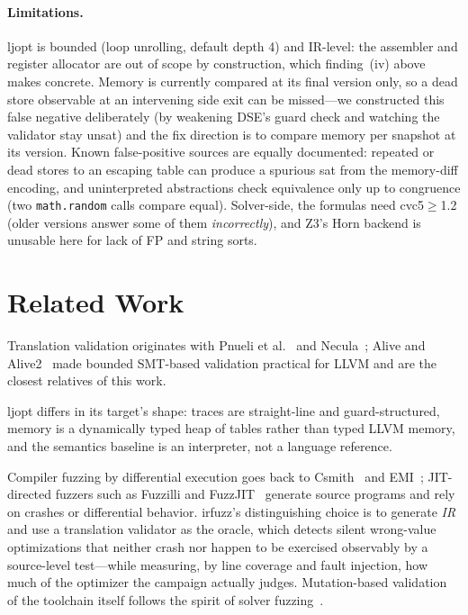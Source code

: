 \documentclass[runningheads]{llncs}
\newif\iffull \fulltrue
\newcommand{\full}[1]{#1}
\newcommand{\brief}[1]{}
\newcommand{\full}[1]{}
\newcommand{\brief}[1]{#1}
\newcommand{\ljopt}{\textsf{ljopt}}
\newcommand{\irfuzz}{\textsf{irfuzz}}
\begin{document}
\paragraph{Limitations.}
\ljopt{} is bounded (loop unrolling, default depth 4) and IR-level: the
assembler and register allocator are out of scope by construction, which
finding~(iv) above makes concrete. Memory is currently compared at its
final version only, so a dead store observable at an intervening side exit
can be missed---we constructed this false negative deliberately (by
weakening DSE's guard check and watching the validator stay
\textsf{unsat}) and the fix direction is to compare memory per snapshot at
its version. \iffull Known false-positive sources are equally
documented:
repeated or dead stores to an escaping table can produce a spurious
\textsf{sat} from the memory-diff encoding, and uninterpreted abstractions
check equivalence only up to congruence (two \texttt{math.random} calls
compare equal). Solver-side, the formulas need cvc5${}\geq{}$1.2
(older versions answer some of them \emph{incorrectly}), and Z3's Horn
backend is unusable here for lack of FP and string sorts.\fi

\iffull
\section{Related Work}\label{sec:related}
\else
\section{Related Work and Conclusion}
\fi

Translation validation originates with Pnueli et
al.~\cite{pnueli1998tv} and Necula~\cite{necula2000tv}; Alive and
Alive2~\cite{lopes2015alive,lopes2021alive2} made bounded SMT-based
validation practical for LLVM and are the closest relatives of this work.
\iffull
\ljopt{} differs in its target's shape: traces are straight-line and
guard-structured, memory is a dynamically typed heap of tables rather than
typed LLVM memory, and the semantics baseline is an interpreter, not a
language reference.
\fi
Compiler fuzzing by differential execution goes back to
Csmith~\cite{yang2011csmith} and EMI~\cite{le2014emi}; JIT-directed fuzzers
such as Fuzzilli and FuzzJIT~\cite{gross2023fuzzilli,wang2023fuzzjit}
generate source programs and rely on crashes or differential behavior.
\irfuzz{}'s distinguishing choice is to generate \emph{IR} and use a
translation validator as the oracle, which detects silent wrong-value
optimizations that neither crash nor happen to be exercised
observably by a source-level test\brief{.}\full{---while measuring, by line
coverage and fault injection, how much of the optimizer the campaign
actually judges.
Mutation-based validation of the toolchain itself follows the spirit of
solver fuzzing~\cite{brummayer2009fuzzsmt}.}
\end{document}

